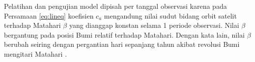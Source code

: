 Pelatihan dan pengujian model dipisah per tanggal observasi karena pada
Persamaan \ref{eq:lineq} koefisien $c_a$ mengandung nilai sudut bidang orbit
satelit terhadap Matahari $\beta$ yang dianggap konstan selama 1 periode
observasi. Nilai $\beta$ bergantung pada posisi Bumi relatif terhadap Matahari.
Dengan kata lain, nilai $\beta$ berubah seiring dengan pergantian hari
sepanjang tahun akibat revolusi Bumi mengitari Matahari \cite{m2019}.
